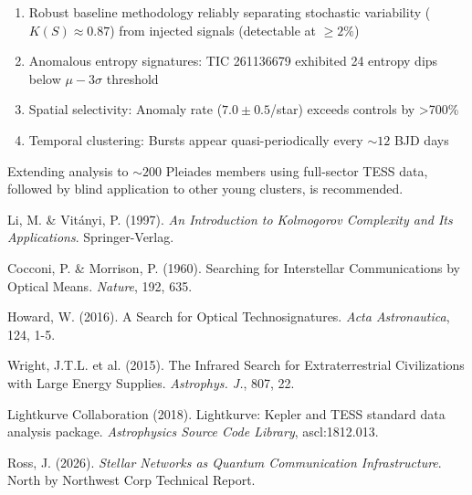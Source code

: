 \documentclass[twocolumn,10pt]{article}
\begin{document}
\begin{enumerate}
    \item Robust baseline methodology reliably separating stochastic variability ($K(S) \approx 0.87$) from injected signals (detectable at $\geq 2\%$)
    \item Anomalous entropy signatures: TIC 261136679 exhibited 24 entropy dips below $\mu-3\sigma$ threshold
    \item Spatial selectivity: Anomaly rate ($7.0 \pm 0.5$/star) exceeds controls by >700\%
    \item Temporal clustering: Bursts appear quasi-periodically every $\sim 12$ BJD days
\end{enumerate}

Extending analysis to $\sim 200$ Pleiades members using full-sector TESS data, followed by blind application to other young clusters, is recommended.

\begin{thebibliography}{}

 Li, M. \& Vitányi, P. (1997). \emph{An Introduction to Kolmogorov Complexity and Its Applications}. Springer-Verlag.

 Cocconi, P. \& Morrison, P. (1960). Searching for Interstellar Communications by Optical Means. \emph{Nature}, 192, 635.

 Howard, W. (2016). A Search for Optical Technosignatures. \emph{Acta Astronautica}, 124, 1-5.

 Wright, J.T.L. et al. (2015). The {} Infrared Search for Extraterrestrial Civilizations with Large Energy Supplies. \emph{Astrophys. J.}, 807, 22.

 Lightkurve Collaboration (2018). Lightkurve: Kepler and TESS standard data analysis package. \emph{Astrophysics Source Code Library}, ascl:1812.013.

 Ross, J. (2026). \emph{Stellar Networks as Quantum Communication Infrastructure}. North by Northwest Corp Technical Report.

\end{thebibliography}
\end{document}
